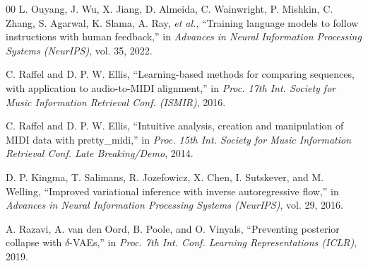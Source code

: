 \documentclass[conference]{IEEEtran}
\begin{document}
\begin{thebibliography}{00}
L. Ouyang, J. Wu, X. Jiang, D. Almeida, C. Wainwright, P. Mishkin, C. Zhang, S. Agarwal, K. Slama, A. Ray, \textit{et al.}, ``Training language models to follow instructions with human feedback,'' in \textit{Advances in Neural Information Processing Systems (NeurIPS)}, vol. 35, 2022.

C. Raffel and D. P. W. Ellis, ``Learning-based methods for comparing sequences, with application to audio-to-MIDI alignment,'' in \textit{Proc. 17th Int. Society for Music Information Retrieval Conf. (ISMIR)}, 2016.

C. Raffel and D. P. W. Ellis, ``Intuitive analysis, creation and manipulation of MIDI data with pretty\_midi,'' in \textit{Proc. 15th Int. Society for Music Information Retrieval Conf. Late Breaking/Demo}, 2014.

D. P. Kingma, T. Salimans, R. Jozefowicz, X. Chen, I. Sutskever, and M. Welling, ``Improved variational inference with inverse autoregressive flow,'' in \textit{Advances in Neural Information Processing Systems (NeurIPS)}, vol. 29, 2016.

A. Razavi, A. van den Oord, B. Poole, and O. Vinyals, ``Preventing posterior collapse with $\delta$-VAEs,'' in \textit{Proc. 7th Int. Conf. Learning Representations (ICLR)}, 2019.

\end{thebibliography}
\end{document}
